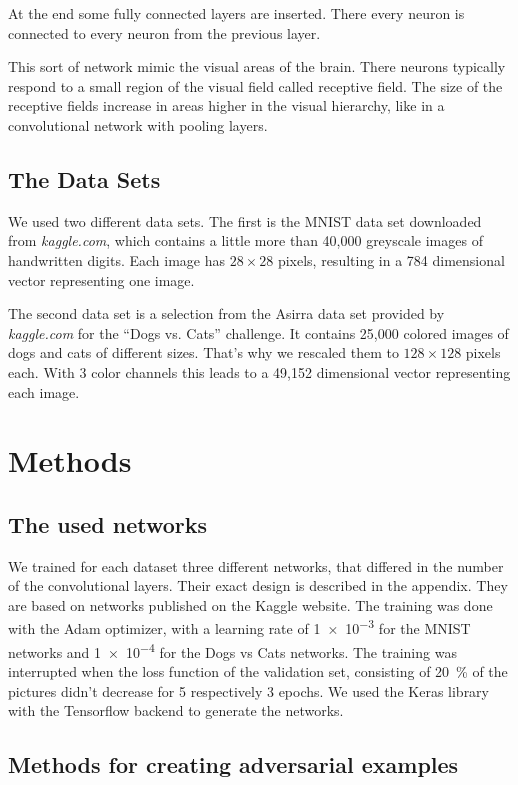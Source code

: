 \documentclass[%
 reprint,
 amsmath,amssymb,
 aps,
]{revtex4-1}
\begin{document}
At the end some fully connected layers are inserted. There every neuron is connected to every neuron from the previous layer.

This sort of network mimic the visual areas of the brain. There neurons typically respond to a small region of the visual field called receptive field. The size of the receptive fields increase in areas higher in the visual hierarchy, like in a convolutional network with pooling layers.

\subsection{The Data Sets}

We used two different data sets. The first is the MNIST data set downloaded from \emph{kaggle.com}, which contains a little more than 40,000 greyscale images of handwritten digits. Each image has $28\times 28$ pixels, resulting in a 784 dimensional vector representing one image. 

The second data set is a selection from the Asirra data set provided by \emph{kaggle.com} for the ``Dogs vs. Cats'' challenge. It contains 25,000 colored images of dogs and cats of different sizes. That's why we rescaled them to $128\times 128$ pixels each. With 3 color channels this leads to a 49,152 dimensional vector representing each image. 
\section{Methods}

\subsection{The used networks}

We trained for each dataset three different networks, that differed in the number of the convolutional layers. Their exact design is described in the appendix. They are based on networks published on the Kaggle website. The training was done with the Adam optimizer, with a learning rate of \SI{1e-3}{} for the MNIST networks and \SI{1e-4}{} for the Dogs vs Cats networks. The training was interrupted when the loss function of the validation set, consisting of \SI{20}{\percent} of the pictures didn't decrease for 5 respectively 3 epochs. 
We used the Keras library with the Tensorflow backend to generate the networks.

\subsection{Methods for creating adversarial examples}
\end{document}
